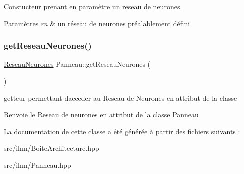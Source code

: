 Constucteur prenant en paramètre un reseau de neurones. 


\begin{DoxyParams}{Paramètres}
{\em rn} & un réseau de neurones préalablement défini \\
\hline
\end{DoxyParams}
\mbox{\label{class_panneau_a8ed7e5db0c0c8a0da729d3c785032643}} 
\subsubsection{\texorpdfstring{get\+Reseau\+Neurones()}{getReseauNeurones()}}
{\footnotesize\ttfamily \hyperlink{class_reseau_neurones}{Reseau\+Neurones} Panneau\+::get\+Reseau\+Neurones (\begin{DoxyParamCaption}{ }\end{DoxyParamCaption})}



getteur permettant d\textquotesingle{}acceder au Reseau de Neurones en attribut de la classe 

\begin{DoxyReturn}{Renvoie}
le Reseau de neurones en attribut de la classe \hyperlink{class_panneau}{Panneau} 
\end{DoxyReturn}


La documentation de cette classe a été générée à partir des fichiers suivants \+:\begin{DoxyCompactItemize}
\item 
src/ihm/Boite\+Architecture.\+hpp\item 
src/ihm/Panneau.\+hpp\end{DoxyCompactItemize}
